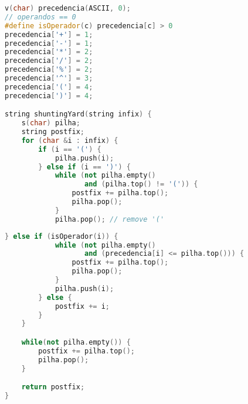 
\begin{lstlisting}[language=C++, title=Shunting-Yard (PART I)]
v(char) precedencia(ASCII, 0);
// operandos == 0
#define isOperador(c) precedencia[c] > 0
precedencia['+'] = 1;
precedencia['-'] = 1;
precedencia['*'] = 2;
precedencia['/'] = 2;
precedencia['%'] = 2;
precedencia['^'] = 3;
precedencia['('] = 4;
precedencia[')'] = 4;

string shuntingYard(string infix) {
	s(char) pilha;
	string postfix;
	for (char &i : infix) {
		if (i == '(') {
			pilha.push(i);
		} else if (i == ')') {
			while (not pilha.empty() 
			       and (pilha.top() != '(')) {
				postfix += pilha.top();
				pilha.pop();
			}
			pilha.pop(); // remove '('
\end{lstlisting}

\begin{lstlisting}[language=C++, title=Shunting-Yard (PART II)]
		} else if (isOperador(i)) {
			while (not pilha.empty() 
			       and (precedencia[i] <= pilha.top())) {
				postfix += pilha.top();
				pilha.pop();
			}
			pilha.push(i);
		} else {
			postfix += i;
		}
	}

	while(not pilha.empty()) {
		postfix += pilha.top();
		pilha.pop();
	}

	return postfix;
}
\end{lstlisting}